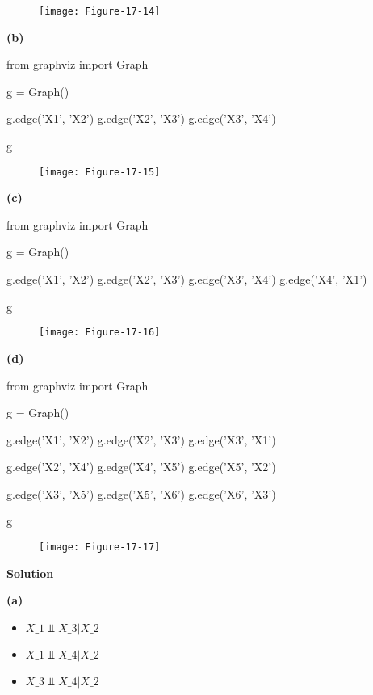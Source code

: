 \begin{figure}[H]
\centering
\texttt{[image: Figure-17-14]}
\end{figure}

\textbf{(b)}

\begin{python}
from graphviz import Graph

g = Graph()

g.edge('X1', 'X2')
g.edge('X2', 'X3')
g.edge('X3', 'X4')

g
\end{python}
 
\begin{figure}[H]
\centering
\texttt{[image: Figure-17-15]}
\end{figure}

\textbf{(c)}

\begin{python}
from graphviz import Graph

g = Graph()

g.edge('X1', 'X2')
g.edge('X2', 'X3')
g.edge('X3', 'X4')
g.edge('X4', 'X1')

g
\end{python}

\begin{figure}[H]
\centering
\texttt{[image: Figure-17-16]}
\end{figure}

\textbf{(d)}

\begin{python}
from graphviz import Graph

g = Graph()

g.edge('X1', 'X2')
g.edge('X2', 'X3')
g.edge('X3', 'X1')

g.edge('X2', 'X4')
g.edge('X4', 'X5')
g.edge('X5', 'X2')

g.edge('X3', 'X5')
g.edge('X5', 'X6')
g.edge('X6', 'X3')

g
\end{python}

\begin{figure}[H]
\centering
\texttt{[image: Figure-17-17]}
\end{figure}

\textbf{Solution}

\textbf{(a)}

\begin{itemize}[tightlist]
\item
  $X\_{1} \text{ ⫫ } X\_{3} |{} X\_{2} $
\item
  $X\_{1} \text{ ⫫ } X\_{4} |{} X\_{2} $
\item
  $X\_{3} \text{ ⫫ } X\_{4} |{} X\_{2} $
\end{itemize}

